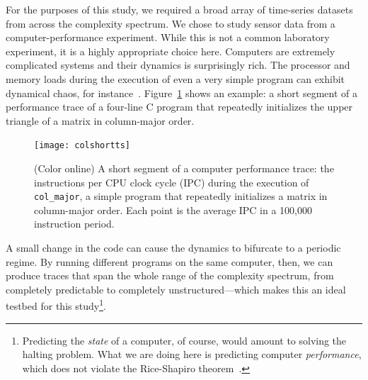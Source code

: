 \documentclass[%
pre,
reprint,
superscriptaddress,
showpacs,
nofootinbib,
nobibnotes,
 amsmath,amssymb,
 aps,
]{revtex4-1}
\newcommand{\col}{{\tt col\_major}\xspace}
\begin{document}

For the purposes of this study, we required a broad array of
time-series datasets from across the complexity spectrum.  We chose to
study sensor data from a computer-performance experiment.  While this
is not a common laboratory experiment, it is a highly appropriate
choice here.  Computers are extremely complicated systems and their
dynamics is surprisingly rich.
The processor and memory loads during the execution of even a very
simple program can exhibit dynamical chaos, for
instance~\cite{mytkowicz09}.  Figure~\ref{fig:col-ipc} shows an
example: a short segment of a performance trace of a four-line C
program that repeatedly initializes the upper triangle of a matrix in
column-major order.
%
 \begin{figure}[htp]
    \centering
    \texttt{[image: colshortts]}
    \caption{(Color online) A short segment of a computer performance trace: the
      instructions per CPU clock cycle (IPC) during the execution of
      \col, a simple program that repeatedly initializes a matrix in
      column-major order.  Each point is the average IPC in a 100,000
      instruction period.}
   \label{fig:col-ipc}
  \end{figure}
%
A small change in the code can cause the dynamics to bifurcate to a
periodic regime.  
% 
By running different programs on the same computer, then, we can
produce traces that span the whole range of the complexity spectrum,
from completely predictable to completely unstructured---which makes
this an ideal testbed for this study\footnote{Predicting the
  \emph{state} of a computer, of course, would amount to solving the
  halting problem.  What we are doing here is predicting computer
  \emph{performance}, which does not violate the Rice-Shapiro
  theorem~\cite{hopcroft2007}.}.
\end{document}
